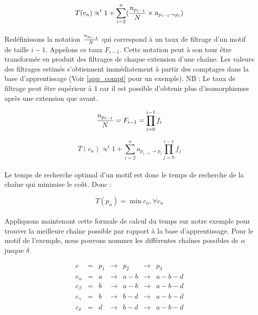\documentclass[12pt,french,twoside]{report}
\begin{document}
\begin{equation}
 T(c_n) \propto^t 1 + \sum_{i=2}^n ({n_{p_{i-1}} \over N} \times a_{p_{i-1} \rightarrow p_i})
\end{equation}

\paragraph{}Redéfinissons la notation ${n_{p_{i-1}} \over N}$ qui correspond à un taux de filtrage d'un motif de taille $i-1$.
Appelons ce taux $F_{i-1}$. Cette notation peut à son tour être transformée en
produit des filtrages de chaque extension d'une chaîne. Les valeurs des filtrages estimés s'obtiennent immédiatement à partir des
comptages dans la base d'apprentissage (Voir \ref{app_compt} pour un exemple). NB : Le taux de filtrage peut être supérieur à 1
car il est possible d'obtenir plus d'isomorphismes après une extension que avant.

\begin{equation}
 {n_{p_{i-1}} \over N} = F_{i-1} = \prod_{i=0}^{i-1} f_i
\end{equation}

\begin{equation}
 T(c_n) \propto^t 1 + \sum_{i=2}^n a_{p_{i-1} \rightarrow p_i} \prod_{j=0}^{i-1} f_j
\end{equation}

\paragraph{}Le temps de recherche optimal d'un motif est donc le temps de recherche de la chaîne qui minimise le coût. Donc :

\begin{equation}
 T(p_n) = \min c_n, \forall c_n
\end{equation}


\paragraph{}Appliquons maintenant cette formule de calcul du temps sur notre exemple pour trouver la meilleure chaîne possible par
rapport à la base d'apprentissage. Pour le motif de l'exemple, nous pouvons nommer les différentes chaînes possibles de $\alpha$
jusque $\delta$.

\[
\begin{array}{ccccccc}
 c         & = & p_1 & \rightarrow & p_2     & \rightarrow & p_3 \\
 c_\alpha  & = & a   & \rightarrow & a\!-\!b & \rightarrow & a\!-\!b\!-\!d \\
 c_\beta   & = & b   & \rightarrow & a\!-\!b & \rightarrow & a\!-\!b\!-\!d \\
 c_\gamma  & = & b   & \rightarrow & b\!-\!d & \rightarrow & a\!-\!b\!-\!d \\
 c_\delta  & = & d   & \rightarrow & b\!-\!d & \rightarrow & a\!-\!b\!-\!d \\
\end{array}
\]
\end{document}
